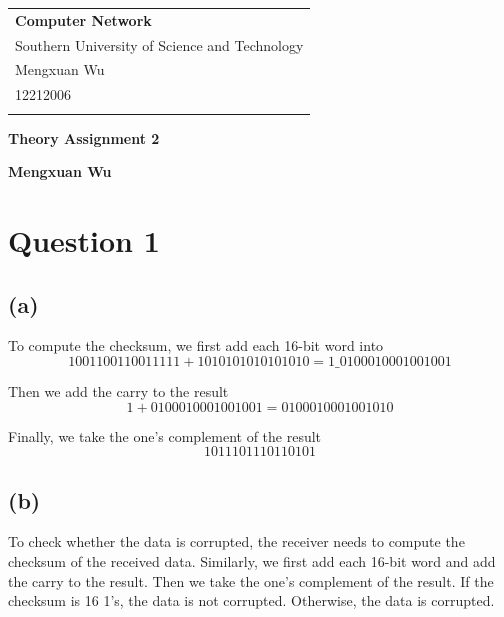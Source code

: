 \documentclass[a4paper,12pt]{article}
\begin{document}
\thispagestyle{empty} %

\begin{tabular}{p{15.5cm}}
{\large \bf Computer Network} \\
Southern University of Science and Technology \\ Mengxuan Wu \\ 12212006 \\
\hline
\\
\end{tabular}

\vspace*{0.3cm} %

\begin{center}
	{\Large \bf Theory Assignment 2}
	\vspace{2mm}

	{\bf Mengxuan Wu}
		
\end{center}  

\vspace{0.4cm}

\section*{Question 1}

\subsection*{(a)}

To compute the checksum, we first add each 16-bit word into 
\begin{equation*}
  1001100110011111 + 1010101010101010 = 1\_0100010001001001
\end{equation*}

Then we add the carry to the result
\begin{equation*}
  1 + 0100010001001001 = 0100010001001010
\end{equation*}

Finally, we take the one's complement of the result
\begin{equation*}
  1011101110110101
\end{equation*}

\subsection*{(b)}

To check whether the data is corrupted, the receiver needs to compute the checksum of the received data. Similarly, we first add each 16-bit word and add the carry to the result. Then we take the one's complement of the result. If the checksum is 16 1's, the data is not corrupted. Otherwise, the data is corrupted.
\end{document}
